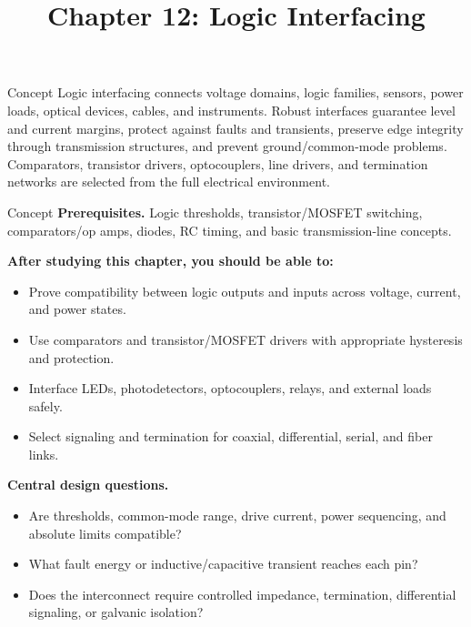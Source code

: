 \documentclass[10pt,letterpaper]{article}
\title{Chapter 12: Logic Interfacing}
\author{}
\date{}
\begin{document}
\maketitle

\begin{CornellOverviewBox}{Concept}
Logic interfacing connects voltage domains, logic families, sensors, power loads, optical devices, cables, and instruments. Robust interfaces guarantee level and current margins, protect against faults and transients, preserve edge integrity through transmission structures, and prevent ground/common-mode problems. Comparators, transistor drivers, optocouplers, line drivers, and termination networks are selected from the full electrical environment.
\end{CornellOverviewBox}
\begin{CornellOverviewBox}{Concept}
\textbf{Prerequisites.} Logic thresholds, transistor/MOSFET switching, comparators/op amps, diodes, RC timing, and basic transmission-line concepts.

\textbf{After studying this chapter, you should be able to:}
\begin{itemize}
  \item Prove compatibility between logic outputs and inputs across voltage, current, and power states.
  \item Use comparators and transistor/MOSFET drivers with appropriate hysteresis and protection.
  \item Interface LEDs, photodetectors, optocouplers, relays, and external loads safely.
  \item Select signaling and termination for coaxial, differential, serial, and fiber links.
\end{itemize}\textbf{Central design questions.}
\begin{itemize}
  \item Are thresholds, common-mode range, drive current, power sequencing, and absolute limits compatible?
  \item What fault energy or inductive/capacitive transient reaches each pin?
  \item Does the interconnect require controlled impedance, termination, differential signaling, or galvanic isolation?
\end{itemize}\end{CornellOverviewBox}
\end{document}
